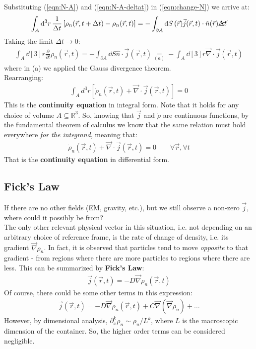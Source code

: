 \documentclass[../template.tex]{subfiles}
\begin{document}
Substituting (\ref{eqn:N-A}) and (\ref{eqn:N-A-deltat}) in (\ref{eqn:change-N}) we arrive at:
\begin{align*}
\int_A \dd[3]{r} \frac{1}{\Delta t} \left[\rho_n(\vec{r},t+\Delta t)- \rho_n(\vec{r},t) \right] = -\int_{\partial A} \dd{S}(\vec{r}) \vec{j}(\vec{r},t)\cdot \hat{n}(\vec{r}) \cancel{\Delta t}
\end{align*}
Taking the limit $\Delta t\to 0$:
\begin{align*}
\int_A \dd[3]{r} \frac{\partial}{\partial t}\rho_n(\vec{r},t) = -\int_{\partial A} \dd{S} \hat{n} \cdot \vec{j}(\vec{r},t) \underset{(a)}{=} - \int_A \dd[3]{r} \vec{\nabla} \cdot \vec{j}(\vec{r},t)
\end{align*}
where in (a) we applied the Gauss divergence theorem.\\
Rearranging:
\begin{align*}
\int_A d^3r [\dot{\rho}_n(\vec{r},t) + \vec{\nabla}\cdot \vec{j}(\vec{r},t)] = 0
\end{align*}
This is the \textbf{continuity equation} in integral form. Note that it holds for any choice of volume $A \subseteq \mathbb{R}^3$. So, knowing that $\vec{j}$ and $\dot{\rho}$ are continuous functions, by the fundamental theorem of calculus we know that the same relation must hold everywhere \textit{for the integrand}, meaning that:   
\begin{align}
\dot{\rho}_n (\vec{r},t) + \vec{\nabla} \cdot \vec{j}(\vec{r},t) = 0 \qquad \forall \vec{r}, \forall t
\label{eqn:continuity}
\end{align} 
That is the \textbf{continuity equation} in differential form.\\

\subsection{Fick's Law}
If there are no other fields (EM, gravity, etc.), but we still observe a non-zero $\vec{j}$, where could it possibly be from?\\
The only other relevant physical vector in this situation, i.e. not depending on an arbitrary choice of reference frame, is the  rate of change of density, i.e. its gradient $\vec{\nabla}\rho_n$. In fact, it is observed that particles tend to move \textit{opposite} to that gradient - from regions where there are more particles to regions where there are less. This can be summarized by \textbf{Fick's Law}:
\begin{align}
\vec{j}(\vec{r},t) = -D\vec{\nabla} \rho_n(\vec{r},t)
\label{eqn:fickslaw}
\end{align}
Of course, there could be some other terms in this expression:
\begin{align*}
\vec{j}(\vec{r},t) = -D\vec{\nabla} \rho_n(\vec{r},t) + C\vec{\nabla}(\vec{\nabla}\rho_n) + \dots
\end{align*}
However, by dimensional analysis, $\partial_x^k \rho_n \sim \rho_n/L^k$, where $L$ is the macroscopic dimension of the container. So, the higher order terms can be considered negligible.
\end{document}

